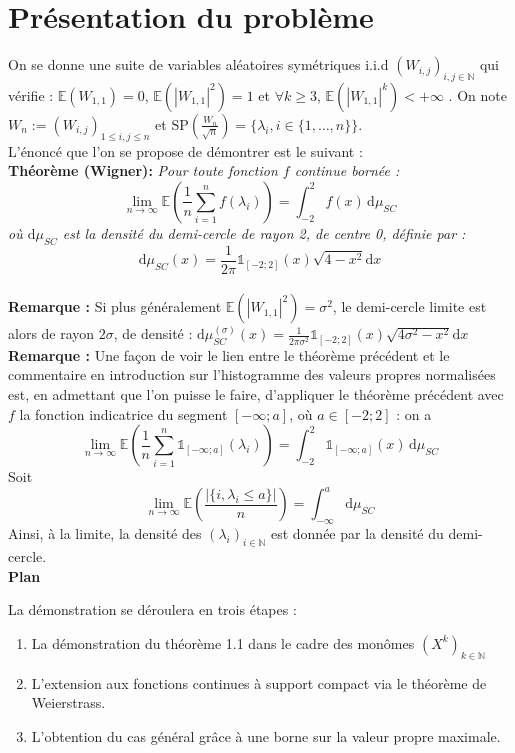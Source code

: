 \documentclass[10pt,a4paper]{article}
\begin{document}
\section{Présentation du problème}
	On se donne une suite de  variables aléatoires symétriques i.i.d $(W_{i,j})_{i,j \in \mathbb{N}} $ qui vérifie : $\mathbb{E}(W_{1,1})=0 $, $ \mathbb{E}\left (\left| W_{1,1}  \right|^2\right )=1 $  et  $ \forall k \geq 3 $, $ \mathbb{E}(\left| W_{1,1}  \right|^k) < +\infty $ . On note $W_n := (W_{i,j})_{1 \leq i,j \leq n}$ et $\text{SP}(\frac{W_n}{\sqrt{n}})= \{ \lambda_i , i \in \{1,\dots,n\}\} $.\\
L'énoncé que l'on se propose de démontrer est le suivant : \\


\textbf{Théorème (Wigner):} \textit{Pour toute fonction $f$ continue bornée : 
\[ \lim_{n \to \infty} \mathbb{E}\left (\frac{1}{n} \sum_{i=1}^n f(\lambda_i)\right ) = \int_{-2}^2 f(x) \, \mathrm{d}\mu_{SC} \] où $\mathrm{d}\mu_{SC}$ est la densité du demi-cercle de rayon 2, de centre 0, définie par : \[\mathrm{d}\mu_{SC}(x) =\frac{1}{2\pi}\mathds{1}_{[-2;2]}(x)\sqrt{4-x^2} \mathrm{d}x\] }\\

\textbf{Remarque :} Si plus généralement $ \mathbb{E}(\left| W_{1,1}  \right|^2)= \sigma^2 $, le demi-cercle limite est alors de rayon $2\sigma$, de densité : $\mathrm{d}\mu_{SC}^{(\sigma)}(x) =\frac{1}{2\pi{\sigma^2}}\mathds{1}_{[-2;2]}(x)\sqrt{4\sigma^2-x^2} \mathrm{d}x$ \\

\textbf{Remarque :} Une façon de voir le lien entre le théorème précédent et le commentaire en introduction sur l'histogramme des valeurs propres normalisées est, en admettant que l'on puisse le faire, d'appliquer le théorème précédent avec $f$ la fonction indicatrice du segment $[-\infty;a]$, où $a \in [-2;2]$ : on a 
\[\lim_{n \to \infty} \mathbb{E}\left (\frac{1}{n} \sum_{i=1}^n \mathds{1}_{[-\infty;a]}(\lambda_i)\right ) = \int_{-2}^2 \mathds{1}_{[-\infty;a]}(x) \, \mathrm{d}\mu_{SC} \]
Soit \[\lim_{n \to \infty} \mathbb{E}\left (\frac{|\{i, \lambda_i \leq a \}|}{n}\right )=\int_{-\infty}^a \mathrm{d}\mu_{SC}\]
Ainsi, à la limite, la densité des $(\lambda_i)_{i \in \mathbb{N}}$ est donnée par la densité du demi-cercle.
\\

\textbf{Plan}

La démonstration se déroulera en trois étapes : 
\begin{enumerate}
	\item La démonstration du théorème 1.1 dans le cadre des monômes $(X^k)_{k \in \mathbb{N}}$
	\item L'extension aux fonctions continues à support compact via le théorème de Weierstrass.
	\item L'obtention du cas général grâce à une borne sur la valeur propre maximale.
\end{enumerate}
\end{document}
